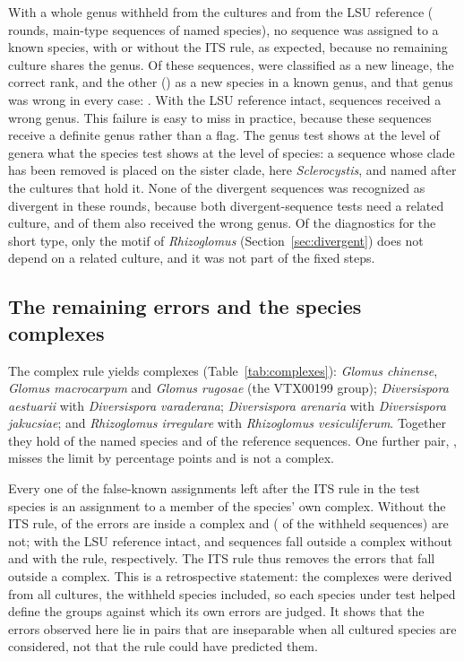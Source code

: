 \documentclass[11pt]{article}
\newcommand{\spn}[1]{\emph{#1}}   %
\begin{document}
With a whole genus withheld from the cultures and from the LSU reference (\GenusFolds{} rounds, \GenusHeldN{}
main-type sequences of named species), no sequence was assigned to a known species, with or without the ITS rule,
as expected, because no remaining culture shares the genus. Of these sequences, \GenusNovelLineage{} were classified
as a new lineage, the correct rank, and the other \GenusWrongN{} (\GenusWrongPct{}) as a new species in a known
genus, and that genus was wrong in every case: \GenusWrongText{}. With the LSU reference intact, \GenusControlWrong{}
sequences received a wrong genus. This failure is easy to miss in practice, because these sequences receive a
definite genus rather than a flag. The genus test shows at the level of genera what the species test shows at the
level of species: a sequence whose clade has been removed is placed on the sister clade, here \spn{Sclerocystis},
and named after the cultures that hold it. None of the \GenusDivN{} divergent sequences was recognized as divergent
in these rounds, because both divergent-sequence tests need a related culture, and \GenusDivWrong{} of them also
received the wrong genus. Of the diagnostics for the short type, only the motif of \spn{Rhizoglomus}
(Section~\ref{sec:divergent}) does not depend on a related culture, and it was not part of the fixed steps.

\subsection{The remaining errors and the species complexes}\label{sec:errorcomplexes}
The complex rule yields \NComplexes{} complexes (Table~\ref{tab:complexes}): \spn{Glomus chinense}, \spn{Glomus
macrocarpum} and \spn{Glomus rugosae} (the VTX00199 group); \spn{Diversispora aestuarii} with \spn{Diversispora
varaderana}; \spn{Diversispora arenaria} with \spn{Diversispora jakucsiae}; and \spn{Rhizoglomus irregulare} with
\spn{Rhizoglomus vesiculiferum}. Together they hold \NComplexSpecies{} of the \NSpecies{} named species and
\ComplexCopiesPct{} of the reference sequences. One further pair, \NearMissPair{}, misses the \NearMissMarker{}
limit by \NearMissPoints{} percentage points and is not a complex.

Every one of the \FKInsideVTwo{} false-known assignments left after the ITS rule in the test species is an
assignment to a member of the species' own complex. Without the ITS rule, \FKInsideVOne{} of the \MfourFKvOne{}
errors are inside a complex and \FKOutsideVOne{} (\FKOutsideVOnePct{} of the withheld sequences) are not; with the LSU
reference intact, \FKOutsideCtlOne{} and \FKOutsideCtlTwo{} sequences fall outside a complex without and with the
rule, respectively. The ITS rule thus removes the errors that fall outside a complex. This is a retrospective
statement: the complexes were derived from all cultures, the withheld species included, so each species under test
helped define the groups against which its own errors are judged. It shows that the errors observed here lie in
pairs that are inseparable when all cultured species are considered, not that the rule could have predicted them.

\end{document}
